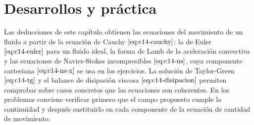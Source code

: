 \documentclass[10pt,openany]{book}
\begin{document}


\section{Desarrollos y práctica}

Las deducciones de este capítulo obtienen las ecuaciones del movimiento de un fluido a partir de la ecuación de Cauchy \(\eqref{eq:c14-cauchy}\): la de Euler \(\eqref{eq:c14-euler}\) para un fluido ideal, la forma de Lamb de la aceleración convectiva y las ecuaciones de Navier-Stokes incompresibles \(\eqref{eq:c14-ns}\), cuya componente cartesiana \(\eqref{eq:c14-ns-x}\) se usa en los ejercicios. La solución de Taylor-Green \(\eqref{eq:c14-tg}\) y el balance de disipación viscosa \(\eqref{eq:c14-disipacion}\) permiten comprobar sobre casos concretos que las ecuaciones son coherentes. En los problemas conviene verificar primero que el campo propuesto cumple la continuidad y después sustituirlo en cada componente de la ecuación de cantidad de movimiento.
\end{document}
